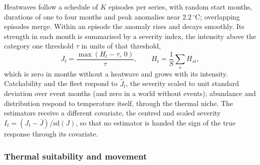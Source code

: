 \documentclass[11pt,a4paper]{article}
\begin{document}
Heatwaves follow a schedule of $K$ episodes per series, with random start months, durations of one to four months and peak anomalies near 2.2\,$^\circ$C; overlapping episodes merge. Within an episode the anomaly rises and decays smoothly. Its strength in each month is summarised by a severity index, the intensity above the category one threshold $\tau$ in units of that threshold,
\begin{equation}
J_t = \frac{\max(H_t - \tau,\ 0)}{\tau}, \qquad H_t = \frac{1}{S}\sum_s H_{st},
\label{eq:severity}
\end{equation}
which is zero in months without a heatwave and grows with its intensity. Catchability and the fleet respond to $\hat J_t$, the severity scaled to unit standard deviation over event months (and zero in a world without events); abundance and distribution respond to temperature itself, through the thermal niche. The estimators receive a different covariate, the centred and scaled severity $I_t = (J_t - \bar J)/\mathrm{sd}(J)$, so that no estimator is handed the sign of the true response through its covariate.

\subsubsection{Thermal suitability and movement}
\end{document}

